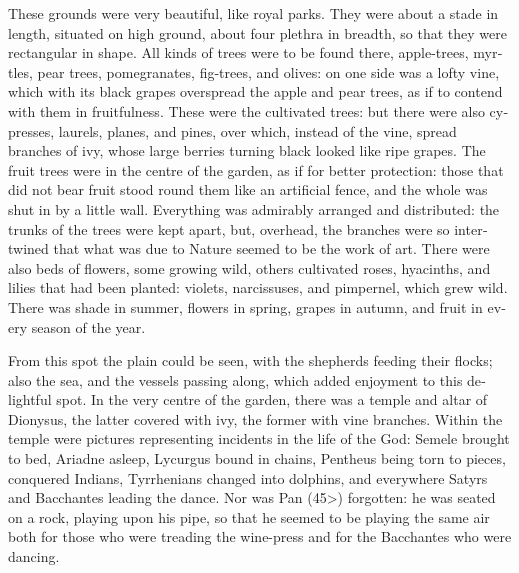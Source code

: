 \documentclass{book}
\begin{document}
\begin{pairs}
\begin{Rightside}
\begin{english}
  These grounds were very beautiful, like royal parks.  They were about a stade in length, situated on high ground, about four plethra in breadth, so that they were rectangular in shape. All kinds of trees were to be found there, apple-trees, myrtles, pear trees, pomegranates, fig-trees, and olives: on one side was a lofty vine, which with its black grapes overspread the apple and pear trees, as if to contend with them in fruitfulness. These were the cultivated trees: but there were also cypresses, laurels, planes, and pines, over which, instead of the vine, spread branches of ivy, whose large berries turning black looked like ripe grapes. The fruit trees were in the centre of the garden, as if for better protection: those that did not bear fruit stood round them like an artificial fence, and the whole was shut in by a little wall. Everything was admirably arranged and distributed: the trunks of the trees were kept apart, but, overhead, the branches were so intertwined that what was due to Nature seemed to be the work of art.  There were also beds of flowers, some growing wild, others cultivated roses, hyacinths, and lilies that had been planted: violets, narcissuses, and pimpernel, which grew wild.  There was shade in summer, flowers in spring, grapes in autumn, and fruit in every season of the year.
\pend


  From this spot the plain could be seen, with the shepherds feeding their flocks; also the sea, and the vessels passing along, which added enjoyment to this delightful spot. In the very centre of the garden, there was a temple and altar of Dionysus, the latter covered with ivy, the former with vine branches.  Within the temple were pictures representing incidents in the life of the God: Semele brought to bed, Ariadne asleep, Lycurgus bound in chains, Pentheus being torn to pieces, conquered Indians, Tyrrhenians changed into dolphins, and everywhere Satyrs and Bacchantes leading the dance.  Nor was Pan (45>) forgotten: he was seated on a rock, playing upon his pipe, so that he seemed to be playing the same air both for those who were treading the wine-press and for the Bacchantes who were dancing.
\pend



\end{english}
\end{Rightside}
\end{pairs}
\end{document}
